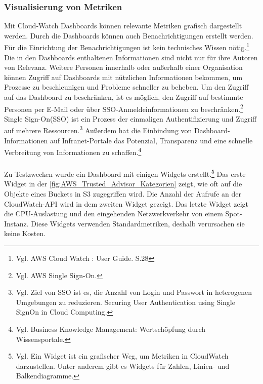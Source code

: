 \subsubsection*{Visualisierung von Metriken}
Mit Cloud-Watch Dashboards können relevante Metriken grafisch dargestellt werden. %
Durch die Dashboards können auch Benachrichtigungen erstellt werden. Für die Einrichtung der Benachrichtigungen ist kein technisches Wissen nötig.\footnote{Vgl. AWS Cloud Watch : User Guide. S.28\cite{AMZ14}}
Die in den Dashboards enthaltenen Informationen sind nicht nur für ihre Autoren von Relevanz. Weitere Personen innerhalb oder außerhalb einer Organisation können Zugriff auf Dashboards mit nützlichen Informationen bekommen, um Prozesse zu beschleunigen und Probleme schneller zu beheben. Um den Zugriff auf das Dashboard zu beschränken, ist es möglich, den Zugriff auf bestimmte Personen per E-Mail oder über SSO-Anmeldeinformationen zu beschränken.\footnote{Vgl.  AWS Single Sign-On.\cite{AMZ33}}  Single Sign-On(SSO) ist ein Prozess der einmaligen Authentifizierung und Zugriff auf mehrere Ressourcen.\footnote{Vgl. Ziel von SSO ist es, die Anzahl von Login und Passwort in heterogenen Umgebungen zu reduzieren. Securing User Authentication using Single SignOn in Cloud Computing\cite{SSO}.} Außerdem hat die Einbindung von Dashboard-Informationen auf Infranet-Portale das Potenzial, Transparenz und eine schnelle Verbreitung von Informationen zu schaffen.\footnote{Vgl. Business Knowledge Management: Wertschöpfung durch Wissensportale\cite{BKM}.}
\\\\
Zu Testzwecken wurde ein Dashboard mit einigen Widgets erstellt.\footnote{Vgl. Ein Widget ist ein grafischer Weg, um Metriken in CloudWatch darzustellen. Unter anderem gibt es Widgets für Zahlen, Linien- und Balkendiagramme.} Das erste Widget in der \autoref{fig:AWS_Trusted_Advisor_Kategorien} zeigt, wie oft auf die Objekte eines Buckets in S3 zugegriffen wird. Die Anzahl der Aufrufe an der CloudWatch-API wird in dem zweiten Widget gezeigt. Das letzte Widget zeigt die CPU-Auslastung und den eingehenden Netzwerkverkehr von einem Spot-Instanz. Diese Widgets verwenden Standardmetriken, deshalb verursachen sie keine Kosten. 
